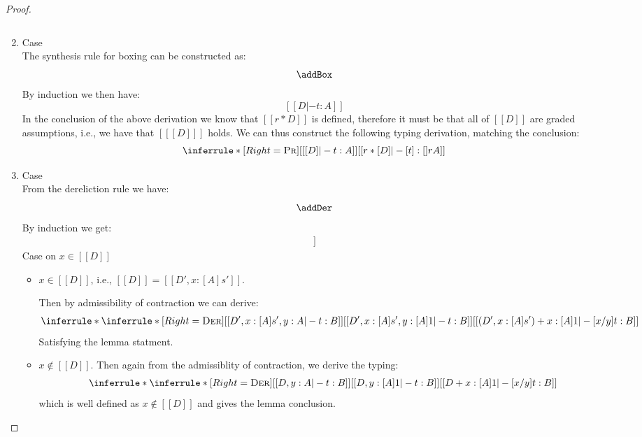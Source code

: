 \begin{proof}
\begin{enumerate}
\[    \]
    \item Case \addBoxName\\
    The synthesis rule for boxing can be constructed as:
    \[
      \addBox
    \]
    By induction we then have:
    \[
      [[ D |- t : A ]]
    \]
    In the conclusion of the above derivation we know that $[[ r * D
    ]]$ is defined, therefore it must be that all of $[[ D ]]$ are
    graded assumptions, i.e., we have that $[[ [ D ] ]]$ holds.
    We can thus construct the following typing derivation, matching the conclusion:
    \[
    \inferrule*[Right=\textsc{Pr}]
    {[[ [D] |- t : A]]}{[[ r * [D] |- [t] : [] r A]]}
    \]
    \item Case \addDerName\\
    From the dereliction rule we have:
    \[
      \addDer
    \]
    By induction we get:
      \begin{align*}
        [[ D, y : A |- t : B ]] \tag{ih}
      \end{align*}
    Case on $x \in [[ D ]]$
    \begin{itemize}
      \item $x \in [[ D ]]$, i.e., $[[ D ]] = [[ D', x : [A] s' ]]$.

        Then by admissibility of contraction we can derive:
        \begin{align*}
          \inferrule*{
            \inferrule*[Right=\textsc{Der}]
             {[[ D', x : [A] s', y : A |- t : B]]}{[[ D', x : [A] s', y : [A] 1 |- t : B ]]}
            }
            { [[ (D', x : [A] s') + x : [A] 1 |- [x/y] t : B ]] }
        \end{align*}
        Satisfying the lemma statment.

     \item $x \not\in [[ D ]]$. Then
      again from the admissiblity of contraction, we derive the
      typing:
        \begin{align*}
          \inferrule*{
            \inferrule*[Right=\textsc{Der}]
             {[[ D, y : A |- t : B]]}{[[ D, y : [A] 1 |- t : B ]]}
            }
            { [[ D + x : [A] 1 |- [x/y] t : B ]] }
        \end{align*}
        which is well defined as $x \not\in [[ D ]]$ and gives the
        lemma conclusion.
        \end{itemize}


\end{enumerate}
\end{proof}
